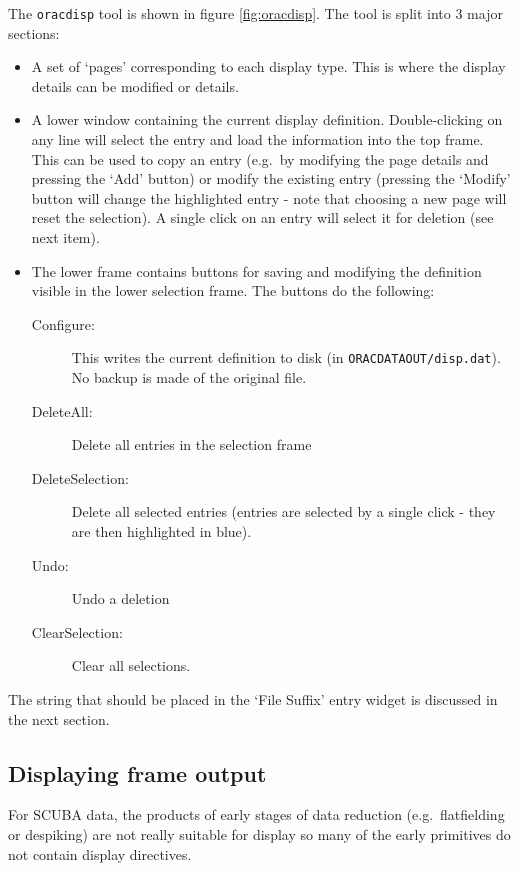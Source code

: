 \documentclass[twoside,11pt]{article}
\newcommand{\xlabel}[1]{}
\renewcommand{\_}{\texttt{\symbol{95}}}
\begin{document}
The \texttt{oracdisp} tool is shown in figure \ref{fig:oracdisp}. The
tool is split into 3 major sections:

\begin{itemize}
\item A set of `pages' corresponding to each display type. This is where 
the display details can be modified or details.
\item A lower window containing the current display
definition. Double-clicking on any line will select the entry and load the
information into the top frame. This can be used to copy an entry (e.g.\ 
by modifying the page details and pressing the `Add' button) or 
modify the existing entry (pressing the `Modify' button will change the 
highlighted entry - note that choosing a new page will reset the 
selection). A single click on an entry will select it for deletion (see next item).

\item  The lower frame contains buttons for saving and modifying the
definition visible in the lower selection frame. The buttons do the following:
\begin{description}
\item[Configure:] This writes the current definition to disk (in
\texttt{ORAC\_DATA\_OUT/disp.dat}). No backup is made of the original file.
\item[DeleteAll:] Delete all entries in the selection frame
\item[DeleteSelection:] Delete all selected entries (entries are selected by a
single click - they are then highlighted in blue).
\item[Undo:] Undo a deletion
\item[ClearSelection:] Clear all selections.

\end{description}
\end{itemize}

The string that should be placed in the `File Suffix' entry
widget is discussed in the next section.

\subsection{Displaying frame output\xlabel{displaying_frame_output}}

For SCUBA data, the products of early stages of data reduction
(e.g.\ flatfielding or despiking) are not really suitable for display
so many of the early primitives do not contain display directives.
\end{document}
